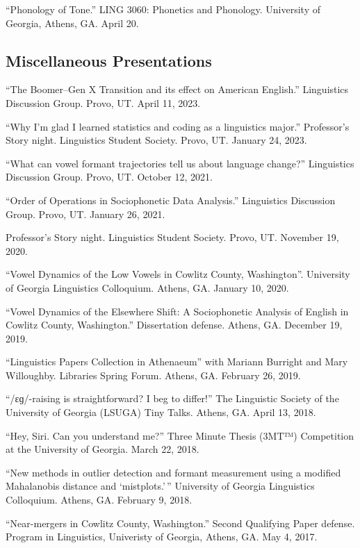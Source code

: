 \documentclass[
]{article}
\begin{document}
``Phonology of Tone.'' LING 3060: Phonetics and Phonology. University of
Georgia, Athens, GA. April 20.

\hypertarget{miscellaneous-presentations}{%
\subsection{Miscellaneous
Presentations}\label{miscellaneous-presentations}}

``The Boomer--Gen X Transition and its effect on American English.''
Linguistics Discussion Group. Provo, UT. April 11, 2023.

``Why I'm glad I learned statistics and coding as a linguistics major.''
Professor's Story night. Linguistics Student Society. Provo, UT. January
24, 2023.

``What can vowel formant trajectories tell us about language change?''
Linguistics Discussion Group. Provo, UT. October 12, 2021.

``Order of Operations in Sociophonetic Data Analysis.'' Linguistics
Discussion Group. Provo, UT. January 26, 2021.

Professor's Story night. Linguistics Student Society. Provo, UT.
November 19, 2020.

``Vowel Dynamics of the Low Vowels in Cowlitz County, Washington''.
University of Georgia Linguistics Colloquium. Athens, GA. January 10,
2020.

``Vowel Dynamics of the Elsewhere Shift: A Sociophonetic Analysis of
English in Cowlitz County, Washington.'' Dissertation defense. Athens,
GA. December 19, 2019.

``Linguistics Papers Collection in Athenaeum'' with Mariann Burright and
Mary Willoughby. Libraries Spring Forum. Athens, GA. February 26, 2019.

``/ɛɡ/-raising is straightforward? I beg to differ!'' The Linguistic
Society of the University of Georgia (LSUGA) Tiny Talks. Athens, GA.
April 13, 2018.

``Hey, Siri. Can you understand me?'' Three Minute Thesis (3MT™)
Competition at the University of Georgia. March 22, 2018.

``New methods in outlier detection and formant measurement using a
modified Mahalanobis distance and `mistplots.'\,'' University of Georgia
Linguistics Colloquium. Athens, GA. February 9, 2018.

``Near-mergers in Cowlitz County, Washington.'' Second Qualifying Paper
defense. Program in Linguistics, Univeristy of Georgia, Athens, GA. May
4, 2017.
\end{document}
